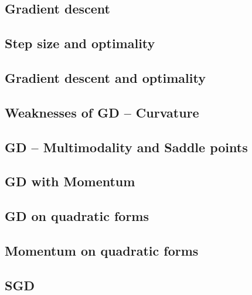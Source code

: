 \subsection{Gradient descent}


\subsection{Step size and optimality}


\subsection{Gradient descent and optimality}


\subsection{Weaknesses of GD -- Curvature}


\subsection{GD -- Multimodality and Saddle points}


\subsection{GD with Momentum}


\subsection{GD on quadratic forms}


\subsection{Momentum on quadratic forms}


\subsection{SGD}



